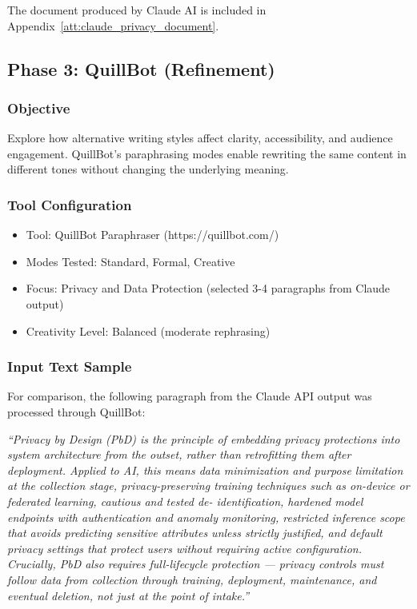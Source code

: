 The document produced by Claude AI is included in Appendix~\ref{att:claude_privacy_document}.

\subsection{Phase 3: QuillBot (Refinement)}

\subsubsection{Objective}
Explore how alternative writing styles
affect clarity, accessibility, and
audience engagement. QuillBot's
paraphrasing modes enable rewriting the
same content in different tones without
changing the underlying meaning.

\subsubsection{Tool Configuration}
\begin{itemize}
    \item Tool: QuillBot Paraphraser
    (https://quillbot.com/)
    \item Modes Tested: Standard, Formal,
    Creative
    \item Focus: Privacy and Data
    Protection (selected 3-4 paragraphs
    from Claude output)
    \item Creativity Level: Balanced
    (moderate rephrasing)
\end{itemize}

\subsubsection{Input Text Sample}
For comparison, the following paragraph
from the Claude API output was processed
through QuillBot:

\begin{framed}
\small
\textit{``Privacy by Design (PbD) is the principle of embedding privacy protections into system 
architecture from the outset, rather than retrofitting them after deployment. Applied to AI, this 
means data minimization and purpose limitation at the collection stage, privacy-preserving 
training techniques such as on-device or federated learning, cautious and tested de-
identification, hardened model endpoints with authentication and anomaly monitoring, restricted 
inference scope that avoids predicting sensitive attributes unless strictly justified, and default 
privacy settings that protect users without requiring active configuration. Crucially, PbD also 
requires full-lifecycle protection — privacy controls must follow data from collection through 
training, deployment, maintenance, and eventual deletion, not just at the point of intake.''}
\end{framed}

